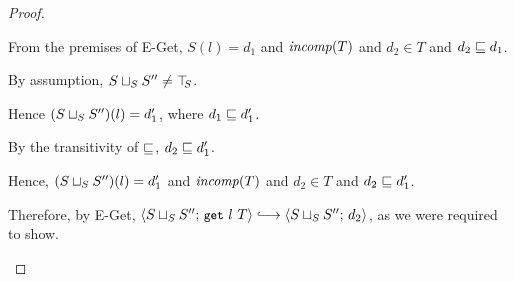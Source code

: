 \begin{proof}
\begin{itemize}
    From the premises of {\sc E-Get}, $S(l) = d_1$ and $\mathit{incomp}(T)$
    and $d_2 \in T$ and $d_2 \sqsubseteq d_1$.

    By assumption, $S \sqcup_{S} S'' \neq \top\hspace{-0.85mm}_{S}$.

    Hence $(S \sqcup_{S} S'')(l) = d'_1$, where $d_1 \sqsubseteq d'_1$.

    By the transitivity of $\sqsubseteq$, $d_2 \sqsubseteq d'_1$.

    Hence, $(S \sqcup_{S} S'')(l) = d'_1$ and $\mathit{incomp}(T)$ and $d_2
    \in T$ and $d_2 \sqsubseteq d'_1$.

    Therefore, by {\sc E-Get},
    $\config{\lubstore{S}{S''}}{\getexp{l}{T}} \parstepsto
    \config{\lubstore{S}{S''}}{d_2}$, as we were required to show.
  \end{itemize}
\end{proof}
